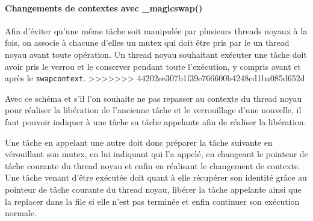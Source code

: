 \paragraph{Changements de contextes avec \_magicswap()} Afin d'éviter qu'une même tâche soit manipulée par plusieurs threads noyaux à la fois, on associe à chacune d'elles un mutex qui doit être pris par le un thread noyau avant toute opération. Un thread noyau souhaitant exécuter une tâche doit avoir pris le verrou et le conserver pendant toute l'exécution, y compris avant et après le \verb!swapcontext!.
>>>>>>> 44202ee307b1f39e766600b4248cd1ba085d652d

Avec ce schéma et s'il l'on souhaite ne pas repasser au contexte du thread noyau pour réaliser la libération de l'ancienne tâche et le verrouillage d'une nouvelle, il faut pouvoir indiquer à une tâche sa tâche appelante afin de réaliser la libération.

Une tâche en appelant une autre doit donc préparer la tâche suivante en vérouillant son mutex, en lui indiquant qui l'a appelé, en changeant le pointeur de tâche courante du thread noyau et enfin en réalisant le changement de contexte. Une tâche venant d'être exécutée doit quant à elle récupérer son identité grâce au pointeur de tâche courante du thread noyau, libérer la tâche appelante ainsi que la replacer dans la file si elle n'est pas terminée et enfin continuer son exécution normale.
